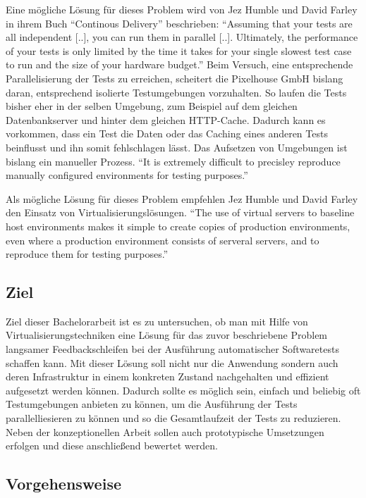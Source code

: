 Eine mögliche Lösung für dieses Problem wird von Jez Humble und David Farley in ihrem Buch "`Continous Delivery"' beschrieben: "`Assuming that your tests are all independent [..], you can run them in parallel [..]. Ultimately, the performance of your tests is only limited by the time it takes for your single slowest test case to run and the size of your hardware budget."' \citep[S.][S. 310]{HumFar10} Beim Versuch, eine entsprechende Parallelisierung der Tests zu erreichen, scheitert die Pixelhouse GmbH bislang daran, entsprechend isolierte Testumgebungen vorzuhalten. So laufen die Tests bisher eher in der selben Umgebung, zum Beispiel auf dem gleichen Datenbankserver und hinter dem gleichen HTTP-Cache. Dadurch kann es vorkommen, dass ein Test die Daten oder das Caching eines anderen Tests beinflusst und ihn somit fehlschlagen lässt. Das Aufsetzen von Umgebungen ist bislang ein manueller Prozess. "`It is extremely difficult to precisley reproduce manually configured environments for testing purposes."' \citep[S.][S. 49]{HumFar10}

Als mögliche Lösung für dieses Problem empfehlen Jez Humble und David Farley den Einsatz von Virtualisierungslösungen. "`The use of virtual servers to baseline host environments makes it simple to create copies of production environments, even where a production environment consists of serveral servers, and to reproduce them for testing purposes."' \citep[S.][S. 304]{HumFar10}

\subsection{Ziel}

Ziel dieser Bachelorarbeit ist es zu untersuchen, ob man mit Hilfe von Virtualisierungstechniken eine Lösung für das zuvor beschriebene Problem langsamer Feedbackschleifen bei der Ausführung automatischer Softwaretests schaffen kann. Mit dieser Lösung soll nicht nur die Anwendung sondern auch deren Infrastruktur in einem konkreten Zustand nachgehalten und effizient aufgesetzt werden können. Dadurch sollte es möglich sein, einfach und beliebig oft Testumgebungen anbieten zu können, um die Ausführung der Tests parallelliesieren zu können und so die Gesamtlaufzeit der Tests zu reduzieren. Neben der konzeptionellen Arbeit sollen auch prototypische Umsetzungen erfolgen und diese anschließend bewertet werden.

\subsection{Vorgehensweise}

